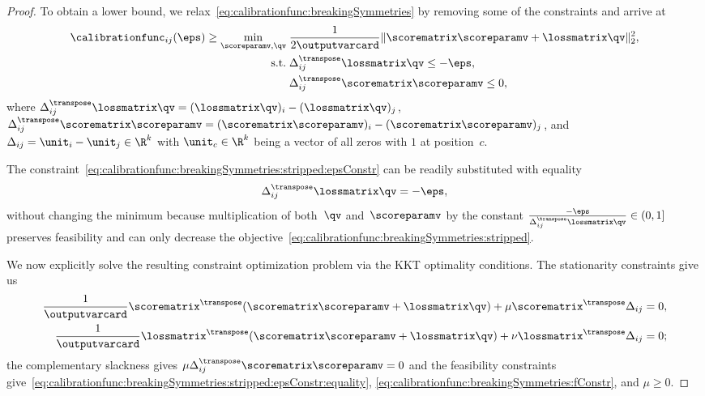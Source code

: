 \documentclass{article}
\begin{document}
\begin{proof}
%
%
%
%
%
%
%
%
%
%
    
    To obtain a lower bound, we relax~\eqref{eq:calibrationfunc:breakingSymmetries} by removing some of the constraints and arrive at
    \begin{align}
    \label{eq:calibrationfunc:breakingSymmetries:stripped}
    \calibrationfunc_{ij}(\eps)
    \geq
    \min_{\scoreparamv, \qv} \;& \frac{1}{2 \outputvarcard}\|\scorematrix \scoreparamv + \lossmatrix \qv\|_2^2, \\
    \label{eq:calibrationfunc:breakingSymmetries:stripped:epsConstr}
    \text{s.t.} \;& \Delta_{ij}^\transpose \lossmatrix \qv \leq - \eps,\\
    \label{eq:calibrationfunc:breakingSymmetries:fConstr}
    &\Delta_{ij}^\transpose \scorematrix \scoreparamv \leq 0,
    \end{align}
    where 
    $\Delta_{ij}^\transpose \lossmatrix \qv = (\lossmatrix \qv)_i - (\lossmatrix \qv)_j$,
    $\Delta_{ij}^\transpose \scorematrix \scoreparamv = (\scorematrix \scoreparamv)_i - (\scorematrix \scoreparamv)_j$, 
    and $\Delta_{ij} = \unit_i - \unit_j \in \R^k$ with $\unit_c \in \R^k$ being a vector of all zeros with $1$ at position~$c$.
%
    
    The constraint~\eqref{eq:calibrationfunc:breakingSymmetries:stripped:epsConstr} can be readily substituted with equality
    \begin{equation}
    \label{eq:calibrationfunc:breakingSymmetries:stripped:epsConstr:equality}
    \Delta_{ij}^\transpose \lossmatrix \qv = - \eps,
    \end{equation}
    without changing the minimum because multiplication of both~$\qv$ and~$\scoreparamv$ by the constant $\frac{-\eps}{\Delta_{ij}^\transpose \lossmatrix \qv} \in (0,1]$ preserves feasibility and can only decrease the objective~\eqref{eq:calibrationfunc:breakingSymmetries:stripped}.
    
    We now explicitly solve the resulting constraint optimization problem via the KKT optimality conditions.
    The stationarity constraints give us
    \begin{align}
    \label{eq:calibrationfunc:proof:KKT:dtheta}
    \frac{1}{\outputvarcard} \scorematrix^\transpose (\scorematrix \scoreparamv + \lossmatrix \qv) + \mu \scorematrix^\transpose \Delta_{ij} = 0,\\
    \label{eq:calibrationfunc:proof:KKT:dq}
    \frac{1}{\outputvarcard} \lossmatrix^\transpose (\scorematrix \scoreparamv + \lossmatrix \qv) + \nu \lossmatrix^\transpose \Delta_{ij} = 0;
    \end{align}
    the complementary slackness gives $\mu \Delta_{ij}^\transpose \scorematrix \scoreparamv = 0$ and the feasibility constraints give~\eqref{eq:calibrationfunc:breakingSymmetries:stripped:epsConstr:equality}, \eqref{eq:calibrationfunc:breakingSymmetries:fConstr}, and $\mu \geq 0$.
    

\end{proof}
\end{document}

